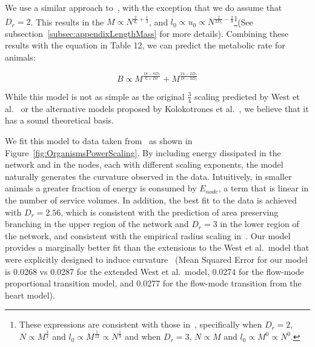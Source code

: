 \documentclass[12pt]{article}
\begin{document}
We use a similar approach to~\cite{banavar10}, with the exception that we do
assume that $D_r=2$. This results in the $M \propto N^{\frac{2}{d_r} +
\frac{1}{3}}$, and $l_0 \propto u_0 \propto N^{\frac{2}{3D_r}
-\frac{2}{9}}$\footnote{These expressions are consistent with those
in~\cite{banavar10}, specifically when $D_r=2$, $N\propto M^{\frac{3}{4}}$ and
$l_0 \propto M^{\frac{1}{12}}\propto N^{\frac{1}{9}}$ and when $D_r=3$, $N\propto M$ and $l_0\propto M^0 \propto N^0$.}(See subsection~\ref{subsec:appendixLengthMass} for more details).
Combining these results with the equation in Table 12, we can predict the
metabolic rate for animals: 

\begin{equation}
  \label{eq:OrganismPower}
  B \propto M^{\frac{18-8D_r}{6+Dr}} + M^{\frac{24-2D_r}{18-3D_r}} 
\end{equation}

\noindent While this model is not as simple as the original $\frac{3}{4}$
scaling predicted by West et al.~\cite{west97} or the alternative models
proposed by Kolokotrones et al.~\cite{kolokotrones2010curvature}, we believe
that it has a sound theoretical basis.

We fit this model to data taken from~\cite{kolokotrones2010curvature} as shown
in Figure~\ref{fig:OrganismsPowerScaling}. By including energy dissipated in
the network and in the nodes, each with different scaling exponents, the model
naturally generates the curvature observed in the data.  Intuitively, in
smaller animals a greater fraction of energy is consumed by $E_{node}$, a term
that is linear in the number of service volumes. In addition, the best fit to
the data is achieved with $D_r = 2.56$, which is consistent with the prediction
of area preserving branching in the upper region of the network and $D_r = 3$
in the lower region of the network, and consistent with the empirical radius
scaling in~\cite{newberry2015testing}.  Our model provides a marginally better
fit than the extensions to the West et al.\ model that were explicitly designed
to induce curvature~\cite{kolokotrones2010curvature} (Mean Squared Error for
our model is 0.0268 vs 0.0287 for the extended West et al.\ model, 0.0274 for
the flow-mode proportional transition model, and 0.0277 for the flow-mode
transition from the heart model). 
 
\end{document}
